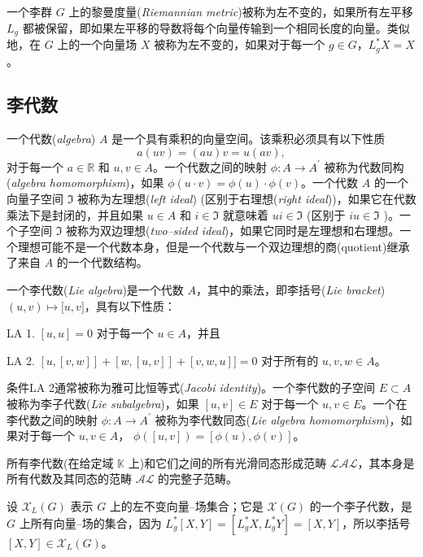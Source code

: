 \documentclass[11pt,fontset=founder]{ctexart}
\begin{document}
一个李群 $G$ 上的黎曼度量(\textit{Riemannian metric})被称为左不变的，如果所有左平移 $L_{g}$ 都被保留，即如果左平移的导数将每个向量传输到一个相同长度的向量。类似地，在 $G$ 上的一个向量场 $X$ 被称为左不变的，如果对于每一个 $g\in G$，$L_{g}^{\ast }X=X$。

\subsection{李代数}

一个代数(\emph{algebra}) $A$ 是一个具有乘积的向量空间。该乘积必须具有以下性质
\begin{equation*}
a(uv)=(au)v=u(av),
\end{equation*}%
对于每一个 $a\in \mathbb{R}$ 和 $u,v\in A$。一个代数之间的映射 $\phi :A\rightarrow A^{\prime }$ 被称为代数同构(\textit{algebra homomorphism})，如果 $\phi (u\cdot v)=\phi (u)\cdot \phi (v)$。一个代数 $A$ 的一个向量子空间 $\mathfrak{I}$ 被称为左理想(\textit{left ideal}) (区别于右理想(\emph{right ideal}))，如果它在代数乘法下是封闭的，并且如果 $u\in A$ 和 $i\in \mathfrak{I}$ 就意味着 $ui\in \mathfrak{I}$ (区别于 $iu\in \mathfrak{I}$%
)。一个子空间 $\mathfrak{I}$ 被称为双边理想(\emph{two--sided ideal})，如果它同时是左理想和右理想。一个理想可能不是一个代数本身，但是一个代数与一个双边理想的商(quotient)继承了来自 $A$ 的一个代数结构。

一个李代数(\emph{Lie algebra})是一个代数 $A$，其中的乘法，即李括号(\emph{Lie bracket}) $(u,v)\mapsto \lbrack u,v]$，具有以下性质：

LA 1. $[u,u]=0$ 对于每一个 $u\in A$，并且

LA 2. $[u,[v,w]]+[w,[u,v]]+[v,w,u]]=0$ 对于所有的 $u,v,w\in A$。

条件LA 2通常被称为雅可比恒等式(\textit{Jacobi identity})。一个李代数的子空间 $E\subset A$ 被称为李子代数(\textit{Lie subalgebra})，如果 $[u,v]\in E$ 对于每一个 $u,v\in E$。一个在李代数之间的映射 $\phi:A\rightarrow A^{\prime }$ 被称为李代数同态(\textit{Lie algebra homomorphism})，如果对于每一个 $u,v\in A$， $\phi
([u,v])=[\phi (u),\phi (v)]$。

所有李代数(在给定域 $\mathbb{K}$ 上)和它们之间的所有光滑同态形成范畴 $\mathcal{LAL}$，其本身是所有代数及其同态的范畴 $\mathcal{AL}$ 的完整子范畴。

设 $\mathcal{X}_{L}(G)$ 表示 $G$ 上的左不变向量–场集合；它是 $\mathcal{X}(G)$ 的一个李子代数，是 $G$ 上所有向量–场的集合，因为 $L_{g}^{\ast }[X,Y]=[L_{g}^{\ast }X,L_{g}^{\ast }Y]=[X,Y]$，所以李括号 $[X,Y]\in \mathcal{X}_{L}(G)$。
\end{document}

